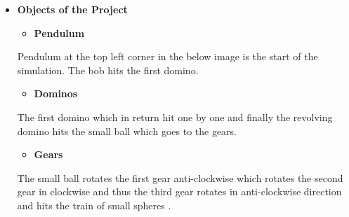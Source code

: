 \documentclass{article}
\begin{document}
\begin{itemize}
 \item[] \textbf{\LARGE Objects of the Project} \\
        \begin{itemize}[label=$\blacksquare$] \vspace{0cm}
            \item \textbf{\Large Pendulum} 
        \end{itemize}
        \large Pendulum at the top left corner in the below image is the start of the simulation. The bob hits the first domino. \\ \vspace{0.55 cm}

        \begin{itemize}[label=$\blacksquare$] \vspace{0cm}
            \item \textbf{\Large Dominos } 
        \end{itemize} 
        \large The first domino which in return hit one by one and finally the revolving domino hits the small ball which goes to the gears. \\ \vspace{0.55 cm}

        \begin{itemize}[label=$\blacksquare$] \vspace{0cm}
            \item \textbf{\Large Gears } 
        \end{itemize}
        \large The small ball rotates the first gear anti-clockwise which rotates the second gear in clockwise and thus the third gear rotates in anti-clockwise direction and hits the train of small spheres .\\ \vspace{0.55 cm}


\end{itemize}
\end{document}
